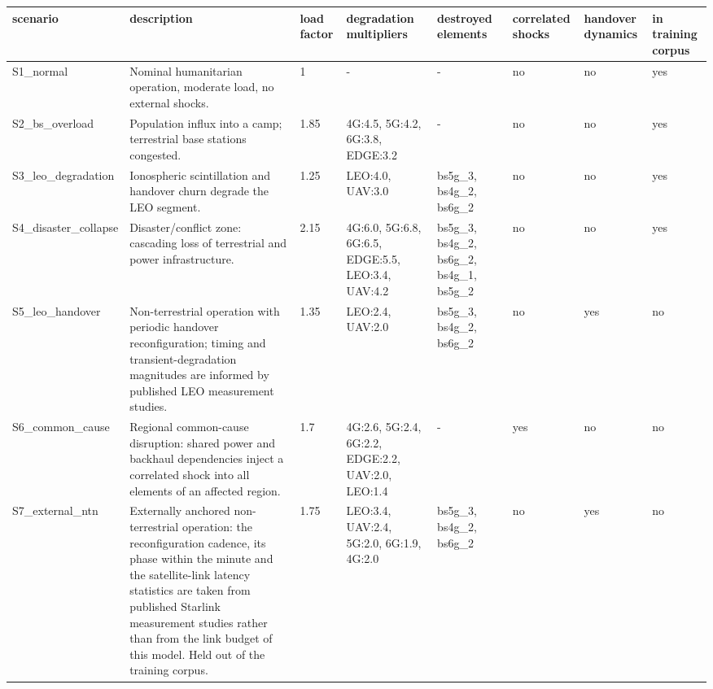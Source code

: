 \begin{tabular}{llllllll}
\toprule
scenario & description & load factor & degradation multipliers & destroyed elements & correlated shocks & handover dynamics & in training corpus \\
\midrule
S1\_normal & Nominal humanitarian operation, moderate load, no external shocks. & 1 & - & - & no & no & yes \\
S2\_bs\_overload & Population influx into a camp; terrestrial base stations congested. & 1.85 & 4G:4.5, 5G:4.2, 6G:3.8, EDGE:3.2 & - & no & no & yes \\
S3\_leo\_degradation & Ionospheric scintillation and handover churn degrade the LEO segment. & 1.25 & LEO:4.0, UAV:3.0 & bs5g\_3, bs4g\_2, bs6g\_2 & no & no & yes \\
S4\_disaster\_collapse & Disaster/conflict zone: cascading loss of terrestrial and power infrastructure. & 2.15 & 4G:6.0, 5G:6.8, 6G:6.5, EDGE:5.5, LEO:3.4, UAV:4.2 & bs5g\_3, bs4g\_2, bs6g\_2, bs4g\_1, bs5g\_2 & no & no & yes \\
S5\_leo\_handover & Non-terrestrial operation with periodic handover reconfiguration; timing and transient-degradation magnitudes are informed by published LEO measurement studies. & 1.35 & LEO:2.4, UAV:2.0 & bs5g\_3, bs4g\_2, bs6g\_2 & no & yes & no \\
S6\_common\_cause & Regional common-cause disruption: shared power and backhaul dependencies inject a correlated shock into all elements of an affected region. & 1.7 & 4G:2.6, 5G:2.4, 6G:2.2, EDGE:2.2, UAV:2.0, LEO:1.4 & - & yes & no & no \\
S7\_external\_ntn & Externally anchored non-terrestrial operation: the reconfiguration cadence, its phase within the minute and the satellite-link latency statistics are taken from published Starlink measurement studies rather than from the link budget of this model. Held out of the training corpus. & 1.75 & LEO:3.4, UAV:2.4, 5G:2.0, 6G:1.9, 4G:2.0 & bs5g\_3, bs4g\_2, bs6g\_2 & no & yes & no \\
\bottomrule
\end{tabular}
